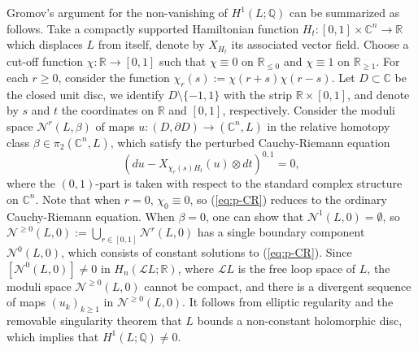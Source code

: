 \documentclass[a4paper]{article}
\numberwithin{equation}{section}
\begin{document}
Gromov's argument for the non-vanishing of $H^1(L;\mathbb{Q})$ can be summarized as follows. Take a compactly supported Hamiltonian function $H_t:[0,1]\times\mathbb{C}^n\rightarrow\mathbb{R}$ which displaces $L$ from itself, denote by $X_{H_t}$ its associated vector field. Choose a cut-off function $\chi:\mathbb{R}\rightarrow[0,1]$ such that $\chi\equiv0$ on $\mathbb{R}_{\leq0}$ and $\chi\equiv1$ on $\mathbb{R}_{\geq1}$. For each $r\geq0$, consider the function $\chi_r(s):=\chi(r+s)\chi(r-s)$. Let $D\subset\mathbb{C}$ be the closed unit disc, we identify $D\setminus\{-1,1\}$ with the strip $\mathbb{R}\times[0,1]$, and denote by $s$ and $t$ the coordinates on $\mathbb{R}$ and $[0,1]$, respectively. Consider the moduli space $\mathcal{N}^r(L,\beta)$ of maps $u:(D,\partial D)\rightarrow(\mathbb{C}^n,L)$ in the relative homotopy class $\beta\in\pi_2(\mathbb{C}^n,L)$, which satisfy the perturbed Cauchy-Riemann equation
\begin{equation}\label{eq:p-CR}
\left(du-X_{\chi_r(s)H_t}(u)\otimes dt\right)^{0,1}=0,
\end{equation}
where the $(0,1)$-part is taken with respect to the standard complex structure on $\mathbb{C}^n$. Note that when $r=0$, $\chi_0\equiv0$, so (\ref{eq:p-CR}) reduces to the ordinary Cauchy-Riemann equation. When $\beta=0$, one can show that $\mathcal{N}^1(L,0)=\emptyset$, so $\mathcal{N}^{\geq0}(L,0):=\bigcup_{r\in[0,1]}\mathcal{N}^r(L,0)$ has a single boundary component $\mathcal{N}^0(L,0)$, which consists of constant solutions to (\ref{eq:p-CR}). Since $\left[\mathcal{N}^0(L,0)\right]\neq0$ in $H_n(\mathcal{L}L;\mathbb{R})$, where $\mathcal{L}L$ is the free loop space of $L$, the moduli space $\mathcal{N}^{\geq0}(L,0)$ cannot be compact, and there is a divergent sequence of maps $(u_k)_{k\geq1}$ in $\mathcal{N}^{\geq0}(L,0)$. It follows from elliptic regularity and the removable singularity theorem that $L$ bounds a non-constant holomorphic disc, which implies that $H^1(L;\mathbb{Q})\neq0$.
\end{document}
